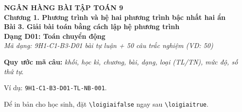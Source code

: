 \documentclass[12pt,a4paper]{article}
\newif\ifloigiai
\begin{document}
\begin{center}
{\Large\textbf{NGÂN HÀNG BÀI TẬP TOÁN 9}}\\[3pt]
\textbf{Chương 1. Phương trình và hệ hai phương trình bậc nhất hai ẩn}\\[2pt]
\textbf{Bài 3. Giải bài toán bằng cách lập hệ phương trình}\\[2pt]
\textbf{Dạng D01: Toán chuyển động}\\[2pt]
\textit{Mã dạng: 9H1-C1-B3-D01  bài tự luận + 50 câu trắc nghiệm \quad (VD: 50)}
\end{center}
\textbf{Quy ước mã câu:} \textit{khối, học kì, chương, bài, dạng, loại (TL/TN), mức độ, số thứ tự}.\par Ví dụ: \texttt{9H1-C1-B3-D01-TL-NB-001}.\par Để in bản cho học sinh, đặt \verb|\loigiaifalse| ngay sau \verb|\loigiaitrue|.
\end{document}
